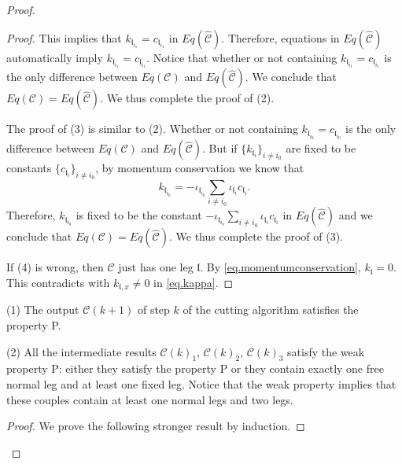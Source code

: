 \begin{proof}
\begin{proof}
This implies that $k_{\mathfrak{l}_{i_1}}=c_{\mathfrak{l}_{i_1}}$ in $Eq(\widehat{\mathcal{C}})$. Therefore, equations in $Eq(\widehat{\mathcal{C}})$ automatically imply $k_{\mathfrak{l}_{i_1}}=c_{\mathfrak{l}_{i_1}}$. Notice that whether or not containing $k_{\mathfrak{l}_{i_1}}=c_{\mathfrak{l}_{i_1}}$ is the only difference between $Eq(\mathcal{C})$ and $Eq(\widehat{\mathcal{C}})$. We conclude that $Eq(\mathcal{C})=Eq(\widehat{\mathcal{C}})$. We thus complete the proof of (2).

The proof of (3) is similar to (2). Whether or not containing $k_{\mathfrak{l}_{i_0}}=c_{\mathfrak{l}_{i_0}}$ is the only difference between $Eq(\mathcal{C})$ and $Eq(\widehat{\mathcal{C}})$. But if $\{k_{\mathfrak{l}_{i}}\}_{i\ne i_0}$ are fixed to be constants $\{c_{\mathfrak{l}_{i}}\}_{i\ne i_0}$, by momentum conservation we know that 
\begin{equation}
     k_{\mathfrak{l}_{i_0}}=-\iota_{\mathfrak{l}_{i_0}}\sum_{i\ne i_0} \iota_{\mathfrak{l}_i}c_{\mathfrak{l}_i}.
\end{equation}
Therefore, $k_{\mathfrak{l}_{i_0}}$ is fixed to be the constant $-\iota_{\mathfrak{l}_{i_0}}\sum_{i\ne i_0} \iota_{\mathfrak{l}_i}c_{\mathfrak{l}_i}$ in $Eq(\widehat{\mathcal{C}})$ and we conclude that $Eq(\mathcal{C})=Eq(\widehat{\mathcal{C}})$. We thus complete the proof of (3).

If (4) is wrong, then $\mathcal{C}$ just has one leg $\mathfrak{l}$. By \eqref{eq.momentumconservation}, $k_{\mathfrak{l}}=0$. This contradicts with $k_{\mathfrak{l},x}\ne 0$ in \eqref{eq.kappa}.
\end{proof}







\begin{lem}\label{lem.normleg} %
(1) The output $\mathcal{C}(k+1)$ of step $k$ of the cutting algorithm satisfies the property P.

(2) All the intermediate results $\mathcal{C}(k)_1$, $\mathcal{C}(k)_2$, $\mathcal{C}(k)_3$ satisfy the weak property P: either they satisfy the property P or they contain exactly one free normal leg and at least one fixed leg. Notice that the weak property implies that these couples contain at least one normal legs and two legs.
\end{lem}
\begin{proof}
We prove the following stronger result by induction.


\end{proof}
\end{proof}
